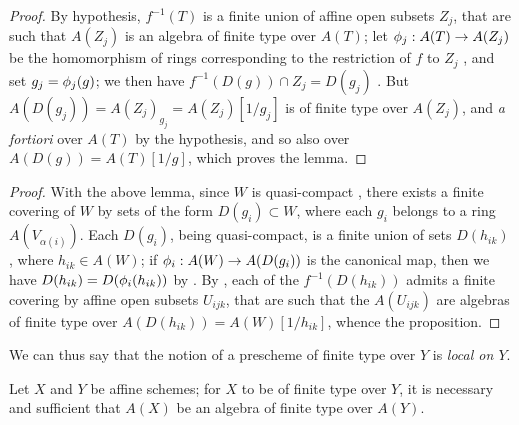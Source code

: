 \begin{proof}
\label{proof-1.6.3.2.1}
By hypothesis, $f^{-1}(T)$ is a finite union of affine open subsets $Z_j$, that are such that $A(Z_j)$ is an algebra of finite type over $A(T)$;
let $\phi_j:A(T)\to A(Z_j)$ be the homomorphism of rings corresponding to the restriction of $f$ to $Z_j$ , and set $g_j=\phi_j(g)$;
we then have $f^{-1}(D(g))\cap Z_j=D(g_j)$ .
But $A(D(g_j))=A(Z_j)_{g_j}=A(Z_j)[1/g_j]$ is of finite type over $A(Z_j)$, and \emph{a fortiori} over $A(T)$ by the hypothesis, and so also over $A(D(g))=A(T)[1/g]$, which proves the lemma.
\end{proof}

\begin{proof}
\label{proof-1.6.3.2}
With the above lemma, since $W$ is quasi-compact , there exists a finite covering of $W$ by sets of the form $D(g_i)\subset W$, where each $g_i$ belongs to a ring $A(V_{\alpha(i)})$.
Each $D(g_i)$, being quasi-compact, is a finite union of sets $D(h_{ik})$, where $h_{ik}\in A(W)$;
if $\phi_i:A(W)\to A(D(g_i))$ is the canonical map, then we have $D(h_{ik})=D(\phi_i(h_{ik}))$ by .
By , each of the $f^{-1}(D(h_{ik}))$ admits a finite covering by affine open subsets $U_{ijk}$, that are such that the $A(U_{ijk})$ are algebras of finite type over $A(D(h_{ik}))=A(W)[1/h_{ik}]$, whence the proposition.
\end{proof}

We
can thus say that the notion of a prescheme of finite type over $Y$ is \emph{local on $Y$}.

\begin{prop}[6.3.3]
\label{1.6.3.3}
Let $X$ and $Y$ be affine schemes;
for $X$ to be of finite type over $Y$, it is necessary and sufficient that $A(X)$ be an algebra of finite type over $A(Y)$.
\end{prop}

